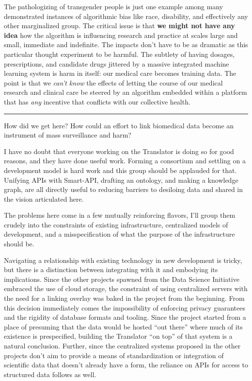 \documentclass[10pt]{article}
\begin{document}
\begin{multicols}{2}
The pathologizing of transgender people is just one example among many
demonstrated instances of algorithmic bias like race, disability, and
effectively any other marginalized group. The critical issue is that
\textbf{we might not have any idea} how the algorithm is influencing
research and practice at scales large and small, immediate and
indefinite. The impacts don't have to be as dramatic as this particular
thought experiment to be harmful. The subtlety of having dosages,
prescriptions, and candidate drugs jittered by a massive integrated
machine learning system is harm in itself: our medical care becomes
training data. The point is that we \emph{can't know} the effects of
letting the course of our medical research and clinical care be steered
by an algorithm embedded within a platform that has \emph{any} incentive
that conflicts with our collective health.

\begin{center}\rule{0.5\linewidth}{0.5pt}\end{center}

How did we get here? How could an effort to link biomedical data become
an instrument of mass surveillance and harm?

I have no doubt that everyone working on the Translator is doing so for
good reasons, and they have done useful work. Forming a consortium and
settling on a development model is hard work and this group should be
applauded for that. Unifying APIs with Smart-API, drafting an ontology,
and making a knowledge graph, are all directly useful to reducing
barriers to desiloing data and shared in the vision articulated here.

The problems here come in a few mutually reinforcing flavors, I'll group
them crudely into the constraints of existing infrastructure,
centralized models of development, and a misspecification of what the
purpose of the infrastructure should be.

Navigating a relationship with existing technology in new development is
tricky, but there is a distinction between integrating with it and
embodying its implications. Since the other projects spawned from the
Data Science Initiative embraced the use of cloud storage, the
constraint of using centralized servers with the need for a linking
overlay was baked in the project from the beginning. From this decision
immediately comes the impossibility of enforcing privacy guarantees and
the rigidity of database formats and tooling. Since the project started
from a place of presuming that the data would be hosted ``out there''
where much of its existence is prespecified, building the Translator
``on top'' of that system is a natural conclusion. Further, since the
centralized systems proposed in the other projects don't aim to provide
a means of standardization or integration of scientific data that
doesn't already have a form, the reliance on APIs for access to
structured data follows as well.


\end{multicols}
\end{document}
